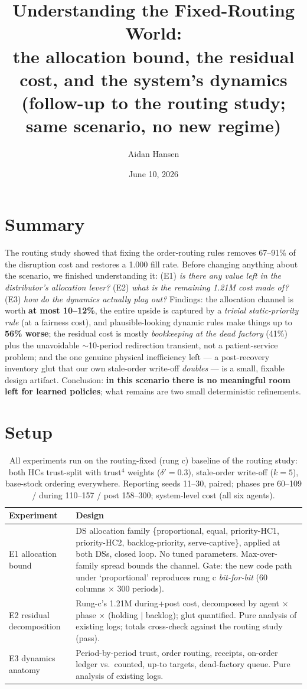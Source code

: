 \documentclass[11pt]{article}
\title{\textbf{Understanding the Fixed-Routing World:}\\
\large the allocation bound, the residual cost, and the system's dynamics\\
\normalsize (follow-up to the routing study; same scenario, no new regime)}
\author{Aidan Hansen}
\date{June 10, 2026}
\begin{document}
\maketitle

\section*{Summary}
The routing study showed that fixing the order-routing rules removes 67--91\% of the
disruption cost and restores a 1.000 fill rate. Before changing anything about the scenario,
we finished understanding it: (E1) \emph{is there any value left in the distributor's
allocation lever?} (E2) \emph{what is the remaining 1.21M cost made of?} (E3) \emph{how do
the dynamics actually play out?} Findings: the allocation channel is worth \textbf{at most
10--12\%}, the entire upside is captured by a \emph{trivial static-priority rule} (at a
fairness cost), and plausible-looking dynamic rules make things up to \textbf{56\% worse};
the residual cost is mostly \emph{bookkeeping at the dead factory} (41\%) plus the
unavoidable $\sim$10-period redirection transient, not a patient-service problem; and the
one genuine physical inefficiency left --- a post-recovery inventory glut that our own
stale-order write-off \emph{doubles} --- is a small, fixable design artifact. Conclusion:
\textbf{in this scenario there is no meaningful room left for learned policies}; what remains
are two small deterministic refinements.

\section{Setup}

\begin{table}[h]
\centering\small
\caption{All experiments run on the routing-fixed (rung c) baseline of the routing study:
both HCs trust-split with trust$^4$ weights ($\delta'=0.3$), stale-order write-off
($k=5$), base-stock ordering everywhere. Reporting seeds 11--30, paired; phases pre 60--109 /
during 110--157 / post 158--300; system-level cost (all six agents).}
\begin{tabular}{lp{10.6cm}}
\toprule
\textbf{Experiment} & \textbf{Design} \\
\midrule
E1 allocation bound & DS allocation family \{proportional, equal, priority-HC1,
priority-HC2, backlog-priority, serve-captive\}, applied at both DSs, closed loop. No tuned
parameters. Max-over-family spread bounds the channel. Gate: the new code path under
`proportional' reproduces rung c \emph{bit-for-bit} (60 columns $\times$ 300 periods). \\
E2 residual decomposition & Rung-c's 1.21M during+post cost, decomposed by agent $\times$
phase $\times$ (holding $\mid$ backlog); glut quantified. Pure analysis of existing logs;
totals cross-check against the routing study (pass). \\
E3 dynamics anatomy & Period-by-period trust, order routing, receipts, on-order ledger
vs.\ counted, up-to targets, dead-factory queue. Pure analysis of existing logs. \\
\bottomrule
\end{tabular}
\end{table}
\end{document}
